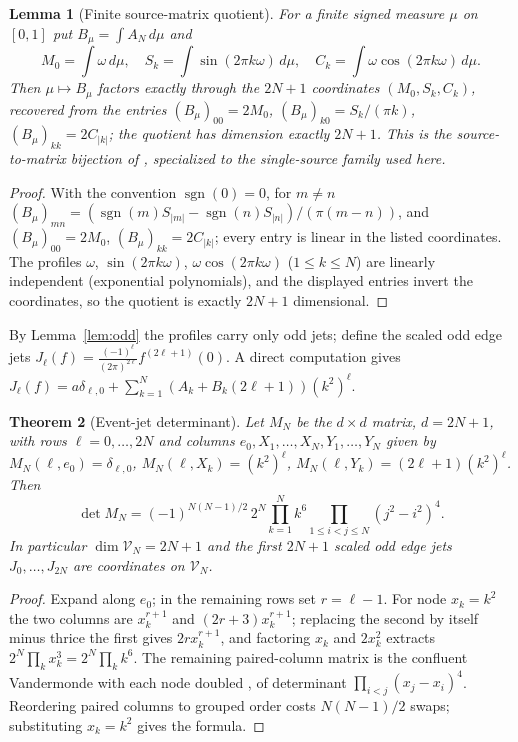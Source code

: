 \documentclass[11pt]{article}
\theoremstyle{plain}
\newtheorem{theorem}{Theorem}[section]
\newtheorem{lemma}[theorem]{Lemma}
\theoremstyle{definition}
\theoremstyle{remark}
\newcommand{\dd}{\,d}
\newcommand{\sgn}{\operatorname{sgn}}
\begin{document}
\begin{lemma}[Finite source-matrix quotient]\label{lem:quotient}
For a finite signed measure $\mu$ on $[0,1]$ put $B_\mu=\int A_N\dd\mu$ and
\[
 M_0=\int\omega\dd\mu,\quad S_k=\int\sin(2\pi k\omega)\dd\mu,\quad
 C_k=\int\omega\cos(2\pi k\omega)\dd\mu.
\]
Then $\mu\mapsto B_\mu$ factors exactly through the $2N+1$ coordinates
$(M_0,S_k,C_k)$, recovered from the entries
$(B_\mu)_{00}=2M_0$, $(B_\mu)_{k0}=S_k/(\pi k)$, $(B_\mu)_{kk}=2C_{|k|}$; the
quotient has dimension exactly $2N+1$. This is the source-to-matrix
bijection of \cite[Prop.~4.2]{ConnesvanSuijlekom2025}, specialized to the
single-source family used here.
\end{lemma}

\begin{proof}
With the convention $\sgn(0)=0$, for $m\ne n$
$(B_\mu)_{mn}=(\sgn(m)S_{|m|}-\sgn(n)S_{|n|})/(\pi(m-n))$, and
$(B_\mu)_{00}=2M_0$, $(B_\mu)_{kk}=2C_{|k|}$; every entry is linear in the listed
coordinates. The profiles $\omega$, $\sin(2\pi k\omega)$,
$\omega\cos(2\pi k\omega)$ ($1\le k\le N$) are linearly independent (exponential
polynomials), and the displayed entries invert the coordinates, so the quotient
is exactly $2N+1$ dimensional.
\end{proof}

By Lemma~\ref{lem:odd} the profiles carry only odd jets; define the scaled odd
edge jets $J_\ell(f)=\frac{(-1)^\ell}{(2\pi)^{2\ell}}f^{(2\ell+1)}(0)$. A direct
computation gives $J_\ell(f)=a\delta_{\ell,0}+\sum_{k=1}^N(A_k+B_k(2\ell+1))(k^2)^\ell$.

\begin{theorem}[Event-jet determinant]\label{thm:det}
Let $M_N$ be the $d\times d$ matrix, $d=2N+1$, with rows $\ell=0,\dots,2N$ and
columns $e_0,X_1,\dots,X_N,Y_1,\dots,Y_N$ given by
$M_N(\ell,e_0)=\delta_{\ell,0}$, $M_N(\ell,X_k)=(k^2)^\ell$,
$M_N(\ell,Y_k)=(2\ell+1)(k^2)^\ell$. Then
\[
 \det M_N=(-1)^{N(N-1)/2}\,2^N\prod_{k=1}^N k^6
 \prod_{1\le i<j\le N}(j^2-i^2)^4 .
\]
In particular $\dim\mathcal V_N=2N+1$ and the first $2N+1$ scaled odd edge jets
$J_0,\dots,J_{2N}$ are coordinates on $\mathcal V_N$.
\end{theorem}

\begin{proof}
Expand along $e_0$; in the remaining rows set $r=\ell-1$. For node $x_k=k^2$ the
two columns are $x_k^{r+1}$ and $(2r+3)x_k^{r+1}$; replacing the second by
itself minus thrice the first gives $2r x_k^{r+1}$, and factoring $x_k$ and
$2x_k^2$ extracts $2^N\prod_k x_k^3=2^N\prod_k k^6$. The remaining paired-column
matrix is the confluent Vandermonde with each node doubled
\cite{Gautschi1962}, of determinant $\prod_{i<j}(x_j-x_i)^4$. Reordering paired
columns to grouped order costs $N(N-1)/2$ swaps; substituting $x_k=k^2$ gives the
formula.
\end{proof}
\end{document}
